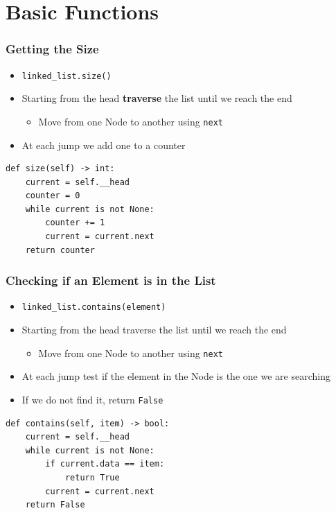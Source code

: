 \documentclass[11pt]{beamer}
\begin{document}
\section{Basic Functions}

	\begin{frame}[fragile]
		\frametitle{Getting the Size}
		\begin{itemize}
			\item \lstinline|linked_list.size()|
			\item Starting from the head \textbf{traverse} the list until we reach the end
			\begin{itemize}
				\item Move from one Node to another using \texttt{next}
			\end{itemize}
			\item At each jump we add one to a counter
		\end{itemize}
		\vspace{0.5cm}
        \pause
		\begin{lstlisting}
def size(self) -> int:
	current = self.__head
	counter = 0
	while current is not None:
		counter += 1
		current = current.next
	return counter
		\end{lstlisting}
	\end{frame}

	\begin{frame}[fragile]
		\frametitle{Checking if an Element is in the List}
		\begin{itemize}
			\item \lstinline|linked_list.contains(element)|
			\item Starting from the head traverse the list until we reach the end
			\begin{itemize}
				\item Move from one Node to another using \texttt{next}
			\end{itemize}
			\item At each jump test if the element in the Node is the one we are searching
			\item If we do not find it, return \lstinline|False|
		\end{itemize}
		\vspace{0.5cm}
        \pause
		\begin{lstlisting}
def contains(self, item) -> bool:
	current = self.__head
	while current is not None:
		if current.data == item:
			return True
		current = current.next
	return False
		\end{lstlisting}
	\end{frame}
\end{document}
